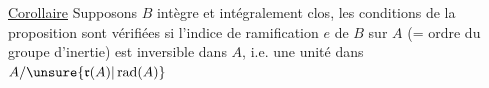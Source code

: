 \uline{Corollaire} Supposons $B$  intègre et intégralement clos,  les conditions de la proposition sont vérifiées si l'indice de ramification $e$ de $B$ sur $A$ (= ordre du groupe d'inertie)  est inversible dans $A$, i.e. une unité dans $A/\unsure{\mathfrak r(A)|\operatorname{rad}(A)}$ 


